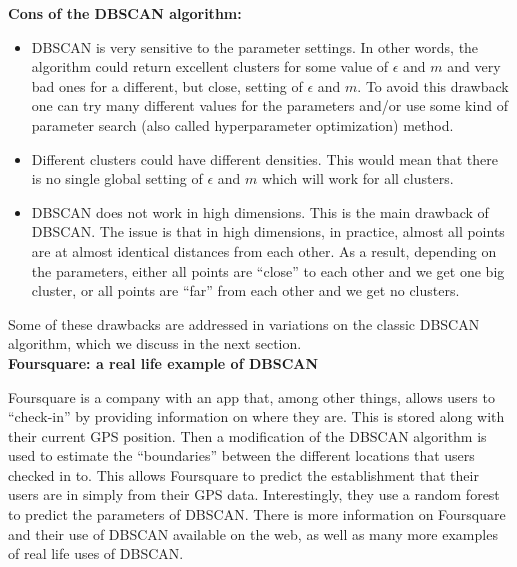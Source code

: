   \noindent\textbf{Cons of the DBSCAN algorithm:}
  \begin{itemize}
    \item DBSCAN is very sensitive to the parameter settings. In other words, the algorithm could return excellent clusters for some value of $\epsilon$ and $m$
    and very bad ones for a different, but close, setting of $\epsilon$ and $m$. To avoid this drawback one can try many different values for the parameters and/or use
    some kind of parameter search (also called hyperparameter optimization) method.
    \item Different clusters could have different densities. This would mean that there is no single global setting of $\epsilon$ and $m$ which will work for all clusters.
    \item DBSCAN does not work in high dimensions. This is the main drawback of DBSCAN. The issue is that in high dimensions, in practice, almost all points are
    at almost identical distances from each other. As a result, depending on the parameters, either all points are ``close'' to each other and we get one big
    cluster, or all points are ``far'' from each other and we get no clusters.
  \end{itemize}
  
  Some of these drawbacks are addressed in variations on the classic DBSCAN algorithm, which we discuss in the next section. \\

  \noindent\textbf{Foursquare: a real life example of DBSCAN}
  
  Foursquare is a company with an app that, among other things, allows users to ``check-in'' by providing information on where they are. This is stored along with their current GPS position.
  Then a modification of the DBSCAN algorithm is used to estimate the ``boundaries'' between the different locations that users checked in to. This allows Foursquare to predict the establishment that
  their users are in simply from their GPS data. Interestingly, they use a random forest to predict the parameters of DBSCAN. There is more information on Foursquare and their use of
  DBSCAN available on the web, as well as many more examples of real life uses of DBSCAN.
